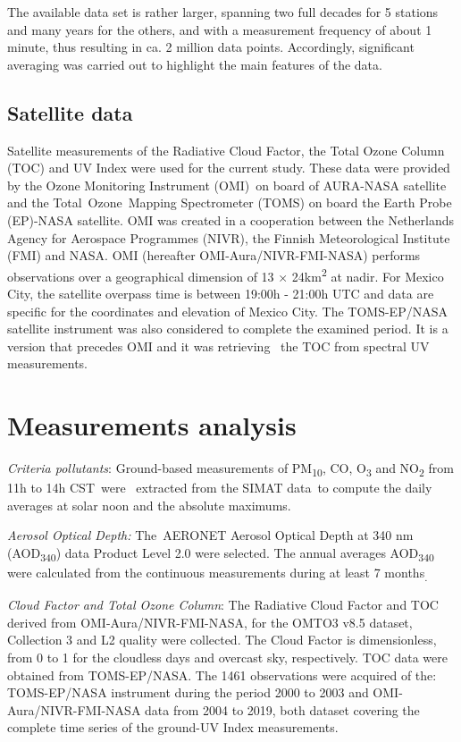 \documentclass[10pt]{article}
\begin{document}
The available data set is rather larger, spanning two full decades for 5
stations and many years for the others, and with a measurement frequency
of about 1 minute, thus resulting in ca. 2 million data points.
Accordingly, significant averaging was carried out to highlight the main
features of the data.

\subsection*{Satellite data}

{\label{677253}}

Satellite measurements of the Radiative Cloud Factor, the Total Ozone
Column (TOC) and UV Index were used for the current study. These data
were provided by the Ozone Monitoring Instrument (OMI)~on board of
AURA-NASA satellite and the Total~Ozone~Mapping Spectrometer (TOMS) on
board the Earth Probe (EP)-NASA satellite. OMI was created in a
cooperation between the Netherlands Agency for Aerospace Programmes
(NIVR), the Finnish Meteorological Institute (FMI) and NASA. OMI
(hereafter OMI-Aura/NIVR-FMI-NASA) performs observations over a
geographical dimension of 13 × 24km\textsuperscript{2} at nadir. For
Mexico City, the satellite overpass time is between 19:00h - 21:00h UTC
and data are specific for the coordinates and elevation of Mexico City.
The TOMS-EP/NASA satellite instrument was also considered to complete
the examined period. It is a version that precedes OMI and it was
retrieving~ the TOC from spectral UV measurements. ~

\section*{Measurements analysis}

{\label{833220}}

\emph{Criteria pollutants}{: Ground-based measurements of
PM}\textsubscript{10}{, CO, O}\textsubscript{3}{ and
NO}\textsubscript{2}{ from 11h to 14h CST~were~} extracted from the
SIMAT data{~to compute the daily averages at solar noon and the absolute
maximums.}

\emph{Aerosol Optical Depth:} The~AERONET Aerosol Optical Depth at 340
nm (AOD\textsubscript{340}) data Product Level 2.0 were selected. The
annual averages AOD\textsubscript{340} were calculated from the
continuous measurements during at least 7 months\textsubscript{.}

\emph{Cloud Factor and Total Ozone Column}: The Radiative Cloud Factor
and TOC derived from OMI-Aura/NIVR-FMI-NASA, for the OMTO3 v8.5 dataset,
Collection 3 and L2 quality were collected. The Cloud Factor is
dimensionless, from 0 to 1 for the cloudless days and overcast sky,
respectively. TOC data were obtained from TOMS-EP/NASA. The 1461
observations were acquired of the: TOMS-EP/NASA instrument during the
period 2000 to 2003 and OMI-Aura/NIVR-FMI-NASA data from 2004 to 2019,
both dataset covering the complete time series of the ground-UV Index
measurements.
\end{document}

